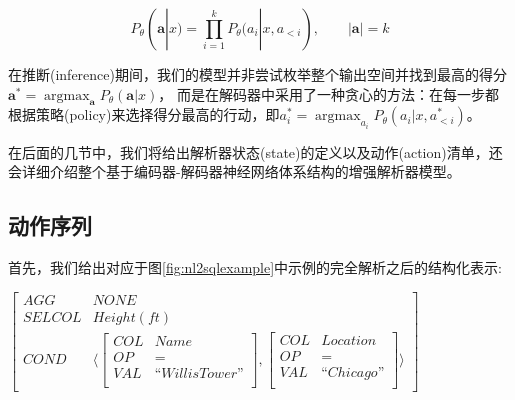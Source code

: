 \begin{equation}
    \label{enl2sql:eq2}
    P_{\theta}(\boldsymbol{a}|x) = \prod^k_{i=1}P_{\theta}(a_{i}|x,a_{<i}),   \qquad |\boldsymbol{a}| = k
\end{equation}

在推断(inference)期间，我们的模型并非尝试枚举整个输出空间并找到最高的得分$\boldsymbol{a}^{*} = \mathop{\arg\max}_{\boldsymbol{a}} P_{\theta}(\boldsymbol{a}|x)$，
而是在解码器中采用了一种贪心的方法：在每一步都根据策略(policy)来选择得分最高的行动，即$a^{*}_{i} = \mathop{\arg\max}_{a_{i}} P_{\theta}(a_{i}|x,a^{*}_{<i})$。

在后面的几节中，我们将给出解析器状态(state)的定义以及动作(action)清单，还会详细介绍整个基于编码器-解码器神经网络体系结构的增强解析器模型。


\subsection{动作序列}
\label{enl2sql:dzxl}

首先，我们给出对应于图\ref{fig:nl2sqlexample}中示例的完全解析之后的结构化表示:
  

$\begin{bmatrix}
  AGG    &  NONE  \\
  SELCOL &  Height(ft) \\
  COND   &   \langle
    \begin{bmatrix}
      COL  &  Name \\
      OP   &  =    \\
      VAL  &  “Willis Tower”\\
    \end{bmatrix}
    ,
    \begin{bmatrix}
      COL  &  Location \\
      OP   &  =    \\
      VAL  &  “Chicago”\\
    \end{bmatrix}
    \rangle
  \end{bmatrix}$

